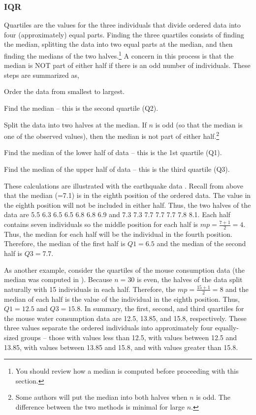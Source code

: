 \documentclass[10pt,openany]{book}\usepackage[]{graphicx}\usepackage[]{color}
\begin{document}
\subsubsection{IQR}
Quartiles are the values for the three individuals that divide ordered data into four (approximately) equal parts.  Finding the three quartiles consists of finding the median, splitting the data into two equal parts at the median, and then finding the medians of the two halves.\footnote{You should review how a median is computed before proceeding with this section.}  A concern in this process is that the median is NOT part of either half if there is an odd number of individuals.  These steps are summarized as,
\begin{Enumerate}
  \item Order the data from smallest to largest.
  \item Find the median -- this is the second quartile (Q2).
  \item Split the data into two halves at the median.  If $n$ is odd (so that the median is one of the observed values), then the median is not part of either half.\footnote{Some authors will put the median into both halves when $n$ is odd.  The difference between the two methods is minimal for large $n$.}
  \item Find the median of the lower half of data -- this is the 1st quartile (Q1).
  \item Find the median of the upper half of data -- this is the third quartile (Q3).
\end{Enumerate}

These calculations are illustrated with the earthquake data .  Recall from above  that the median (=7.1) is in the eighth position of the ordered data.  The value in the eighth position will not be included in either half.  Thus, the two halves of the data are 5.5 6.3 6.5 6.5 6.8 6.8 6.9 and 7.3 7.3 7.7 7.7 7.7 7.8 8.1.  Each half contains seven individuals so the middle position for each half is $mp=\frac{7+1}{2}=4$.  Thus, the median for each half will be the individual in the fourth position.  Therefore, the median of the first half is $Q1=6.5$ and the median of the second half is $Q3=7.7$.

As another example, consider the quartiles of the mouse consumption data (the median was computed in ).  Because $n=30$ is even, the halves of the data split naturally with 15 individuals in each half.  Therefore, the $mp=\frac{15+1}{2}=8$ and the median of each half is the value of the individual in the eighth position.  Thus, $Q1=12.5$ and $Q3=15.8$.  In summary, the first, second, and third quartiles for the mouse water consumption data are 12.5, 13.85, and 15.8, respectively.  These three values separate the ordered individuals into approximately four equally-sized groups -- those with values less than 12.5, with values between 12.5 and 13.85, with values between 13.85 and 15.8, and with values greater than 15.8.
\end{document}
